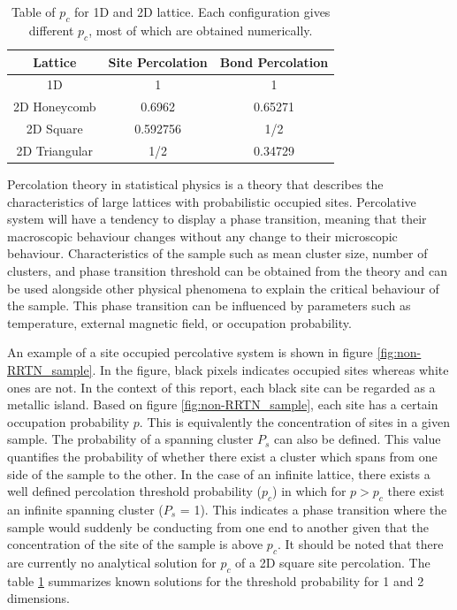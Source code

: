 \documentclass[11pt,a4paper]{report}
\begin{document}
\begin{table}[!b]
\centering
\begin{tabular}{|c|c|c|}
\hline
Lattice       & Site Percolation & Bond Percolation \\ \hline
1D            & 1                & 1                \\ \hline
2D Honeycomb  & 0.6962           & 0.65271          \\ \hline
2D Square     & 0.592756         & 1/2              \\ \hline
2D Triangular & 1/2              & 0.34729          \\ \hline
\end{tabular}%
\caption{Table of $p_c$ for 1D and 2D lattice. Each configuration gives different $p_c$, most of which are obtained numerically.\cite{christensen_2002}}
\label{tab:Percolation_dimension}
\end{table}

Percolation theory in statistical physics is a theory that describes the characteristics of large lattices with probabilistic occupied sites. Percolative system will have a tendency to display a phase transition, meaning that their macroscopic behaviour changes without any change to their microscopic behaviour. Characteristics of the sample such as mean cluster size, number of clusters, and phase transition threshold can be obtained from the theory and can be used alongside other physical phenomena to explain the critical behaviour of the sample. This phase transition can be influenced by parameters such as temperature, external magnetic field, or occupation probability\cite{Stauffer_classical_percolation_2009}. 



An example of a site occupied percolative system is shown in figure \ref{fig:non-RRTN_sample}. In the figure, black pixels indicates occupied sites whereas white ones are not. In the context of this report, each black site can be regarded as a metallic island. Based on figure \ref{fig:non-RRTN_sample}, each site has a certain occupation probability $p$. This is equivalently the concentration of sites in a given sample. The probability of a spanning cluster $P_s$ can also be defined. This value quantifies the probability of whether there exist a cluster which spans from one side of the sample to the other. In the case of an infinite lattice, there exists a well defined percolation threshold probability ($p_c$) in which for $p>p_c$ there exist an infinite spanning cluster ($P_s$ = 1). This indicates a phase transition where the sample would suddenly be conducting from one end to another given that the concentration of the site of the sample is above $p_c$. It should be noted that there  are currently no analytical solution for $p_c$ of a 2D square site percolation. The table \ref{tab:Percolation_dimension} summarizes known solutions for the threshold probability for 1 and 2 dimensions. 
\end{document}

